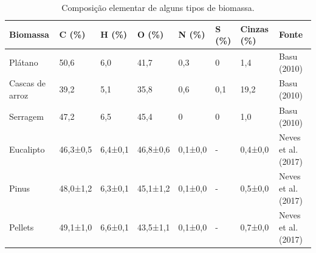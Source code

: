 \begin{table}[!htbp]
	\centering
	\small
	\renewcommand{\arraystretch}{1.3}
	\caption{Composição elementar de alguns tipos de biomassa.}%
	\label{tab:elementar}
	\begin{tabular}{|l|l|l|l|l|l|l|l|}
    	\hline
        \textbf{Biomassa}    & \textbf{C (\%)} & \textbf{H (\%)} & \textbf{O (\%)} & \textbf{N (\%)} & \textbf{S (\%)} & \textbf{Cinzas (\%)} & \textbf{Fonte}      \\
        \hline
        Plátano              & 50,6            & 6,0             & 41,7            & 0,3             & 0               & 1,4                  & Basu (2010)         \\
        \hline
        Cascas de arroz      & 39,2            & 5,1             & 35,8            & 0,6             & 0,1             & 19,2                 & Basu (2010)         \\
        \hline
        Serragem             & 47,2            & 6,5             & 45,4            & 0               & 0               & 1,0                  & Basu (2010)         \\
        \hline
        Eucalipto         & 46,3±0,5        & 6,4±0,1         & 46,8±0,6        & 0,1±0,0         & -               & 0,4±0,0              & Neves et al. (2017) \\
        \hline
        Pinus             & 48,0±1,2        & 6,3±0,1         & 45,1±1,2        & 0,1±0,0         & -               & 0,5±0,0              & Neves et al. (2017) \\
        \hline
        Pellets   & 49,1±1,0        & 6,6±0,1         & 43,5±1,1        & 0,1±0,0         & -               & 0,7±0,0              & Neves et al. (2017) \\
        \hline
        
    \end{tabular}

	\vspace{2mm}
\end{table}


